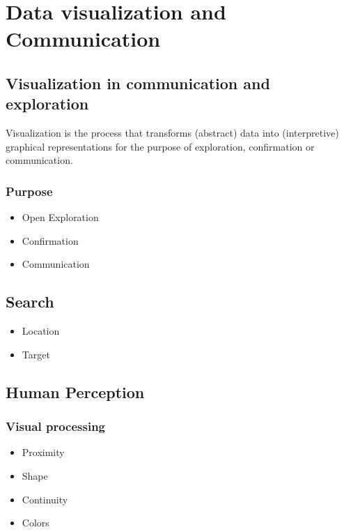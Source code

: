 \chapter{Data visualization and Communication}

\section{Visualization in communication and exploration}

\begin{definition}[visualization]
    Visualization is the process that transforms (abstract) data into (interpretive) graphical representations for the 
    purpose of exploration, confirmation or communication.
\end{definition}


\subsection{Purpose}
\begin{itemize}
    \item Open Exploration
    \item Confirmation
    \item Communication
\end{itemize}

\section{Search}

\begin{itemize}
    \item Location
    \item Target
\end{itemize}

\section{Human Perception}
\subsection{Visual processing}
\begin{itemize}
    \item Proximity
    \item Shape
    \item Continuity
    \item Colors
\end{itemize}

